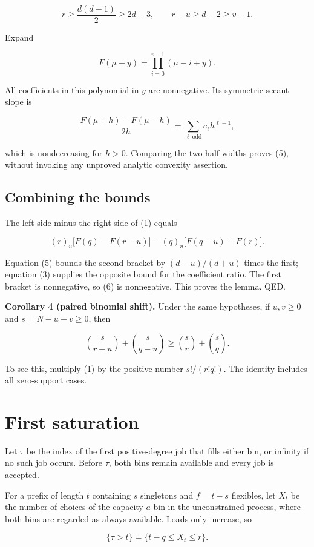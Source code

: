 \[
r\ge\frac{d(d-1)}2\ge2d-3,
\qquad r-u\ge d-2\ge v-1.
\]

Expand

\[
F(\mu+y)=\prod_{i=0}^{v-1}(\mu-i+y).
\]

All coefficients in this polynomial in \(y\) are nonnegative. Its symmetric secant slope is

\[
\frac{F(\mu+h)-F(\mu-h)}{2h}
=\sum_{\ell\ \mathrm{odd}}c_\ell h^{\ell-1},
\]

which is nondecreasing for \(h>0\). Comparing the two half-widths proves (5), without invoking any unproved analytic convexity assertion.

\subsection{Combining the bounds}\label{combining-the-bounds}

The left side minus the right side of (1) equals

\[
(r)_u\bigl[F(q)-F(r-u)\bigr]
-(q)_u\bigl[F(q-u)-F(r)\bigr].\tag{6}
\]

Equation (5) bounds the second bracket by \((d-u)/(d+u)\) times the first; equation (3) supplies the opposite bound for the coefficient ratio. The first bracket is nonnegative, so (6) is nonnegative. This proves the lemma. QED.

\textbf{Corollary 4 (paired binomial shift).} Under the same hypotheses, if \(u,v\ge 0\) and \(s=N-u-v\ge 0\), then

\[
\binom{s}{r-u}+\binom{s}{q-u}
\ge \binom{s}{r}+\binom{s}{q}.\tag{7}
\]

To see this, multiply (1) by the positive number \(s!/(r!q!)\). The identity includes all zero-support cases.

\section{First saturation}\label{first-saturation}

Let \(\tau\) be the index of the first positive-degree job that fills either bin, or infinity if no such job occurs. Before \(\tau\), both bins remain available and every job is accepted.

For a prefix of length \(t\) containing \(s\) singletons and \(f=t-s\) flexibles, let \(X_t\) be the number of choices of the capacity-\(a\) bin in the unconstrained process, where both bins are regarded as always available. Loads only increase, so

\[
\{\tau>t\}=\{t-q\le X_t\le r\}.\tag{8}
\]


